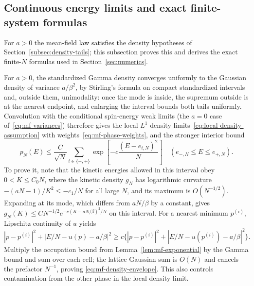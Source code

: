 \subsection{Continuous energy limits and exact finite-system formulas}
\label{subsec:mf-exact}

For $a>0$ the mean-field law satisfies the density hypotheses of
Section~\ref{subsec:density-tails}; this subsection proves this and
derives the exact finite-$N$ formulas used in
Section~\ref{sec:numerics}.

For $a>0$, the standardized Gamma density converges uniformly to the
Gaussian density of variance $a/\beta^2$, by Stirling's formula on
compact standardized intervals and, outside them, unimodality: once the
mode is inside, the supremum outside is at the nearest endpoint, and
enlarging the interval bounds both tails uniformly.
Convolution with the conditional spin-energy weak limits (the $a=0$
case of~\eqref{eq:mf-variances}) therefore gives
the local $L^1$ density limits~\eqref{eq:local-density-assumption} with
weights~\eqref{eq:mf-phase-weights}, and the stronger interior bound
\begin{equation}
 p_N(E)\le\frac C{\sqrt N}\sum_{i\in\{-,+\}}
          \exp\left[-c\frac{(E-e_{i,N})^2}{N}\right]
 \quad(e_{-,N}\le E\le e_{+,N}).
 \label{eq:mf-density-envelope}
\end{equation}
To prove it, note that the kinetic energies allowed in this interval
obey $0<K\le C_0N$, where the kinetic density $g_N$ has logarithmic
curvature
$-(aN-1)/K^2\le-c_1/N$ for all large $N$, and its maximum is
$O(N^{-1/2})$. Expanding at its mode, which differs from $aN/\beta$
by a constant, gives
$g_N(K)\le C N^{-1/2}e^{-c(K-aN/\beta)^2/N}$ on this interval.
For a nearest minimum $p^{(i)}$, Lipschitz continuity of $u$ yields
\[
 |p-p^{(i)}|^2+|E/N-u(p)-a/\beta|^2
 \ge c\{|p-p^{(i)}|^2+|E/N-u(p^{(i)})-a/\beta|^2\}.
\]
Multiply the occupation bound from Lemma~\ref{lem:mf-exponential} by
the Gamma bound and sum over each cell; the lattice Gaussian sum is
$O(N)$ and cancels the prefactor $N^{-1}$, proving
\eqref{eq:mf-density-envelope}. This also controls contamination from
the other phase in the local density limit.

